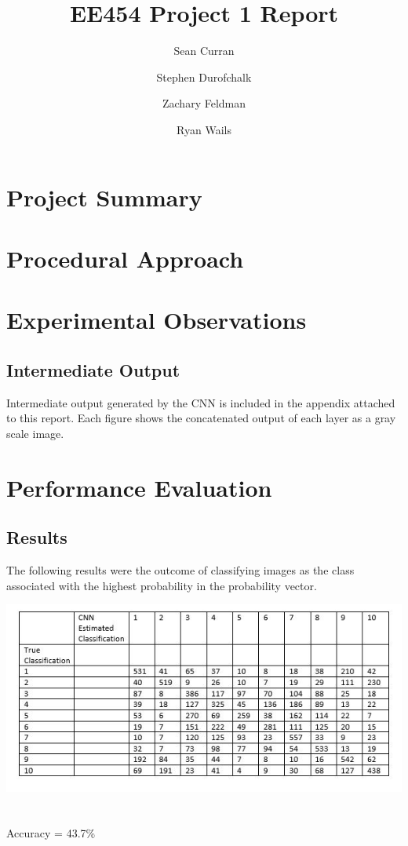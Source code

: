 \documentclass[11pt,english]{article}
\author{Sean Curran \\
\and Stephen Durofchalk \\
\and Zachary Feldman \\
\and Ryan Wails}
\title{EE454 Project 1 Report}
\begin{document}
\maketitle

\newpage
\section{Project Summary}

\section{Procedural Approach}



\section{Experimental Observations}

\subsection{Intermediate Output}

Intermediate output generated by the CNN is included in the appendix attached to this report.  Each figure shows the concatenated output of each layer as a gray scale image.

\section{Performance Evaluation}
\subsection{Results}
	The following results were the outcome of classifying images as the class associated with the highest probability in the probability vector.
\begin{center}
	\includegraphics[scale=0.7]{confusionmatrix}
	~\\~\\
	
		Accuracy = 43.7\%
\end{center}
\end{document}
